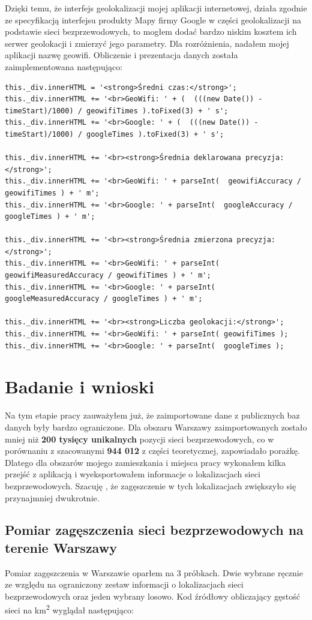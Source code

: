 Dzięki temu, że interfejs geolokalizacji mojej aplikacji internetowej, działa zgodnie ze specyfikacją interfejsu produkty Mapy firmy Google w części geolokalizacji na podstawie sieci bezprzewodowych, to mogłem dodać bardzo niskim kosztem ich serwer geolokacji i zmierzyć jego parametry. Dla rozróżnienia, nadałem mojej aplikacji nazwę geowifi. Obliczenie i prezentacja danych została zaimplementowana następująco:
\begin{verbatim}
this._div.innerHTML = '<strong>Średni czas:</strong>';
this._div.innerHTML += '<br>GeoWifi: ' + (  (((new Date()) - timeStart)/1000) / geowifiTimes ).toFixed(3) + ' s';
this._div.innerHTML += '<br>Google: ' + (  (((new Date()) - timeStart)/1000) / googleTimes ).toFixed(3) + ' s';

this._div.innerHTML += '<br><strong>Średnia deklarowana precyzja:</strong>';
this._div.innerHTML += '<br>GeoWifi: ' + parseInt(  geowifiAccuracy / geowifiTimes ) + ' m';
this._div.innerHTML += '<br>Google: ' + parseInt(  googleAccuracy / googleTimes ) + ' m';

this._div.innerHTML += '<br><strong>Średnia zmierzona precyzja:</strong>';
this._div.innerHTML += '<br>GeoWifi: ' + parseInt(  geowifiMeasuredAccuracy / geowifiTimes ) + ' m';
this._div.innerHTML += '<br>Google: ' + parseInt(  googleMeasuredAccuracy / googleTimes ) + ' m';

this._div.innerHTML += '<br><strong>Liczba geolokacji:</strong>';
this._div.innerHTML += '<br>GeoWifi: ' + parseInt( geowifiTimes );
this._div.innerHTML += '<br>Google: ' + parseInt(  googleTimes );
\end{verbatim}


\section{Badanie i wnioski}
Na tym etapie pracy zauważyłem już, że zaimportowane dane z publicznych baz danych były bardzo ograniczone. Dla obszaru Warszawy zaimportowanych zostało mniej niż \textbf{200 tysięcy unikalnych} pozycji sieci bezprzewodowych, co w porównaniu z szacowanymi \textbf{944 012} z części teoretycznej, zapowiadało porażkę. Dlatego dla obszarów mojego zamieszkania i miejsca pracy wykonałem kilka przejść z aplikacją i wyeksportowałem informacje o lokalizacjach sieci bezprzewodowych. Szacuję , że zagęszczenie w tych lokalizacjach zwiększyło się przynajmniej dwukrotnie.

\subsection{Pomiar zagęszczenia sieci bezprzewodowych na terenie Warszawy}
Pomiar zagęszczenia w Warszawie oparłem na 3 próbkach. Dwie wybrane ręcznie ze względu na ograniczony zestaw informacji o lokalizacjach sieci bezprzewodowych oraz jeden wybrany losowo. Kod źródłowy obliczający gęstość sieci na km\textsuperscript{2} wyglądał następująco:

